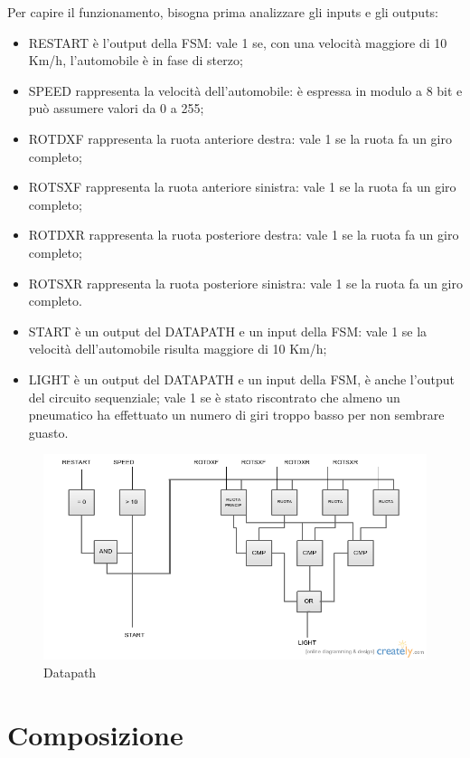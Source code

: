 \documentclass[a4paper,titlepage]{book}
\begin{document}
Per capire il funzionamento, bisogna prima analizzare gli inputs e gli outputs:
\begin{itemize}

\item RESTART è l'output della FSM: vale 1 se, con una velocità maggiore di 10 Km/h, l'automobile è in fase di sterzo;
\item SPEED rappresenta la velocità dell'automobile: è espressa in modulo a 8 bit e può assumere valori da 0 a 255;
\item ROTDXF rappresenta la ruota anteriore destra: vale 1 se la ruota fa un giro completo;
\item ROTSXF rappresenta la ruota anteriore sinistra: vale 1 se la ruota fa un giro completo;
\item ROTDXR rappresenta la ruota posteriore destra: vale 1 se la ruota fa un giro completo;
\item ROTSXR rappresenta la ruota posteriore sinistra: vale 1 se la ruota fa un giro completo.
\item START è un output del DATAPATH e un input della FSM: vale 1 se la velocità dell'automobile risulta maggiore di 10 Km/h;
\item LIGHT è un output del DATAPATH e un input della FSM, è anche l'output del circuito sequenziale; vale 1 se è stato riscontrato che almeno un pneumatico ha effettuato un numero di giri troppo basso per non sembrare guasto.
\end{itemize}

\begin{figure}[!hb]
\centering
\includegraphics[scale=0.45]{schemi/datapath.png}
\caption{Datapath}
\end{figure}


\section{Composizione}
\end{document}
